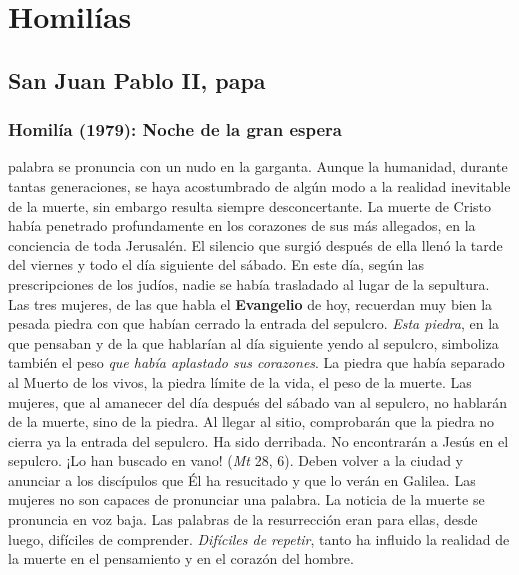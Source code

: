 \newsection
\section{Homilías}

\subsection{San Juan Pablo II, papa}

\subsubsection{Homilía (1979): Noche de la gran espera}


\begin{body}
 palabra  se pronuncia con un nudo en la garganta. Aunque la humanidad, durante tantas generaciones, se haya acostumbrado de algún modo a la realidad inevitable de la muerte, sin embargo resulta siempre desconcertante. La muerte de Cristo había penetrado profundamente en los corazones de sus más allegados, en la conciencia de toda Jerusalén. El silencio que surgió después de ella llenó la tarde del viernes y todo el día siguiente del sábado. En este día, según las prescripciones de los judíos, nadie se había trasladado al lugar de la sepultura. Las tres mujeres, de las que habla el \textbf{Evangelio} de hoy, recuerdan muy bien la pesada piedra con que habían cerrado la entrada del sepulcro. \textit{Esta piedra}, en la que pensaban y de la que hablarían al día siguiente yendo al sepulcro, simboliza también el peso \textit{que había aplastado sus corazones}. La piedra que había separado al Muerto de los vivos, la piedra límite de la vida, el peso de la muerte. Las mujeres, que al amanecer del día después del sábado van al sepulcro, no hablarán de la muerte, sino de la piedra. Al llegar al sitio, comprobarán que la piedra no cierra ya la entrada del sepulcro. Ha sido derribada. No encontrarán a Jesús en el sepulcro. ¡Lo han buscado en vano!  (\textit{Mt} 28, 6). Deben volver a la ciudad y anunciar a los discípulos que Él ha resucitado y que lo verán en Galilea. Las mujeres no son capaces de pronunciar una palabra. La noticia de la muerte se pronuncia en voz baja. Las palabras de la resurrección eran para ellas, desde luego, difíciles de comprender. \textit{Difíciles de repetir}, tanto ha influido la realidad de la muerte en el pensamiento y en el corazón del hombre.


\end{body}
